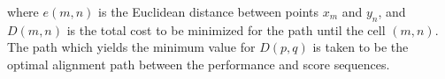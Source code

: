\documentclass{article}
\begin{document}
\begin{comment}
 We assume $A$ and $B$ to be the sets comprising the $x$ co-ordinates and $y$ co-ordinates of the inflection points predicted by our dilated CNN models, wherein the performance and score progress in the $X$ and $Y$ direction respectively. Formally, this can be expressed as follows: \begin{equation*} A=\{a_i \hspace{0.1cm} | \hspace{0.1cm} i \in [1 :N]\}  \hspace{0.5cm} and \hspace{0.5cm} 
B=\{b_i \hspace{0.1cm} | \hspace{0.1cm} i \in [1 :N]\}\end{equation*} 
wherein ($a_i$, $b_i$) denotes the ($x$, $y$) co-ordinates of the $i_{th}$ inflection point, and $N$ is the total number of inflection points.
We extend the set of possible predecessor cells for the cell $(a_i, b_i)$, for all \begin{math} i \in \{2, 4, 6, .., N\} \end{math}; as follows: \\

{P^{ext}}_{a_i,b_i} = P_{a_i,b_i} \cup (\{a_{i-1}, b_{i-1}) | b \in B\} \cap P)
\begin{equation}
{P^{ext}}_{a_i,b_i} = P_{a_i,b_i} \cup \{(a_{i-1}, b_{i-1}) \hspace{0.1cm} | \hspace{0.1cm} i \in \{2, 4, 6, .., N\}
\end{equation}
where \begin{math}P_{a_i, b_i}\end{math} is the set of possible predecessor cells for the cell \begin{math}(a_i, b_i)\end{math} generated using classical DTW.
\end{comment}
where $e(m, n)$ is the Euclidean distance between points $x_m$ and $y_n$, and $D(m, n)$ is the total cost to be minimized for the path until the cell $(m, n)$. The path which yields the minimum value for $D(p, q)$ is taken to be the optimal alignment path between the performance and score sequences.
\end{document}
